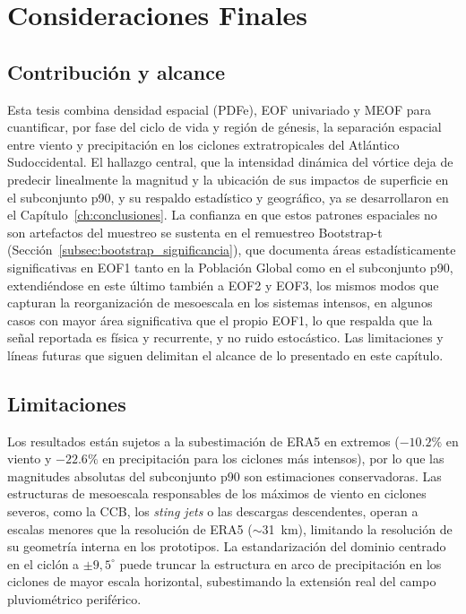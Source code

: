 \chapter{Consideraciones Finales}\label{cap:Considerações}

\section{Contribución y alcance}

Esta tesis combina densidad espacial (PDFe), EOF univariado y MEOF para cuantificar, por fase del ciclo de vida y región de génesis, la separación espacial entre viento y precipitación en los ciclones extratropicales del Atlántico Sudoccidental. El hallazgo central, que la intensidad dinámica del vórtice deja de predecir linealmente la magnitud y la ubicación de sus impactos de superficie en el subconjunto p90, y su respaldo estadístico y geográfico, ya se desarrollaron en el Capítulo~\ref{ch:conclusiones}. La confianza en que estos patrones espaciales no son artefactos del muestreo se sustenta en el remuestreo Bootstrap-t (Sección~\ref{subsec:bootstrap_significancia}), que documenta áreas estadísticamente significativas en EOF1 tanto en la Población Global como en el subconjunto p90, extendiéndose en este último también a EOF2 y EOF3, los mismos modos que capturan la reorganización de mesoescala en los sistemas intensos, en algunos casos con mayor área significativa que el propio EOF1, lo que respalda que la señal reportada es física y recurrente, y no ruido estocástico. Las limitaciones y líneas futuras que siguen delimitan el alcance de lo presentado en este capítulo.

\section{Limitaciones}

Los resultados están sujetos a la subestimación de ERA5 en extremos ($-10.2\%$ en viento y $-22.6\%$ en precipitación para los ciclones más intensos), por lo que las magnitudes absolutas del subconjunto p90 son estimaciones conservadoras. Las estructuras de mesoescala responsables de los máximos de viento en ciclones severos, como la CCB, los \textit{sting jets} o las descargas descendentes, operan a escalas menores que la resolución de ERA5 ($\sim$31~km), limitando la resolución de su geometría interna en los prototipos. La estandarización del dominio centrado en el ciclón a $\pm 9{,}5^{\circ}$ puede truncar la estructura en arco de precipitación en los ciclones de mayor escala horizontal, subestimando la extensión real del campo pluviométrico periférico.

